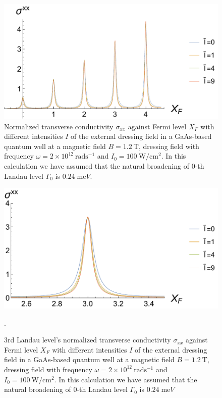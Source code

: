 \begin{figure}[t]
\includegraphics[scale=0.55]{figures/fig_5}
\caption{\label{fig_5} Normalized transverse conductivity $\sigma_{xx}$ against Fermi level $X_F$ with different intensities $I$ of the external dressing field in a GaAs-based quantum well at a magnetic field $B = 1.2~\text{T}$, dressing field with frequency $\omega =2\times10^{12}~\text{rad}\text{s}^{-1}$ and $I_0 =100~\text{W}/\text{cm}^{2}$. In this calculation we have assumed that the natural  broadening of $0$-th Landau level $\Gamma_0$ is $0.24\;\text{me}V$.}
\end{figure}
\begin{figure}[t]
\includegraphics[scale=0.55]{figures/fig_6}
\caption{\label{fig_6} $3$rd Landau level’s normalized transverse conductivity $\sigma_{xx}$ against Fermi level $X_F$ with different intensities $I$ of the external dressing field in a GaAs-based quantum well at a magnetic field $B = 1.2~\text{T}$, dressing field with frequency $\omega =2\times10^{12}~\text{rad}\text{s}^{-1}$ and $I_0 =100~\text{W}/\text{cm}^{2}$. In this calculation we have assumed that the natural  broadening of $0$-th Landau level $\Gamma_0$ is $0.24\;\text{me}V$}.
\end{figure}

